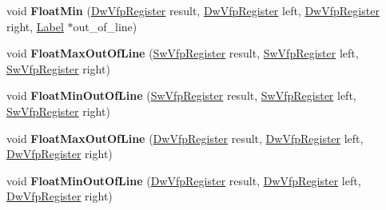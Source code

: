 \begin{DoxyCompactItemize}
\item 
\mbox{\label{classv8_1_1internal_1_1TurboAssembler_ad56ca4667be262f3c181763b7418ae6a}} 
void {\bfseries Float\+Min} (\mbox{\hyperlink{classv8_1_1internal_1_1DwVfpRegister}{Dw\+Vfp\+Register}} result, \mbox{\hyperlink{classv8_1_1internal_1_1DwVfpRegister}{Dw\+Vfp\+Register}} left, \mbox{\hyperlink{classv8_1_1internal_1_1DwVfpRegister}{Dw\+Vfp\+Register}} right, \mbox{\hyperlink{classv8_1_1internal_1_1Label}{Label}} $\ast$out\+\_\+of\+\_\+line)
\item 
\mbox{\label{classv8_1_1internal_1_1TurboAssembler_aeb975af81663503679483df1f5dd9027}} 
void {\bfseries Float\+Max\+Out\+Of\+Line} (\mbox{\hyperlink{classv8_1_1internal_1_1SwVfpRegister}{Sw\+Vfp\+Register}} result, \mbox{\hyperlink{classv8_1_1internal_1_1SwVfpRegister}{Sw\+Vfp\+Register}} left, \mbox{\hyperlink{classv8_1_1internal_1_1SwVfpRegister}{Sw\+Vfp\+Register}} right)
\item 
\mbox{\label{classv8_1_1internal_1_1TurboAssembler_ad75e6097be8ddc545fba95068e153ba6}} 
void {\bfseries Float\+Min\+Out\+Of\+Line} (\mbox{\hyperlink{classv8_1_1internal_1_1SwVfpRegister}{Sw\+Vfp\+Register}} result, \mbox{\hyperlink{classv8_1_1internal_1_1SwVfpRegister}{Sw\+Vfp\+Register}} left, \mbox{\hyperlink{classv8_1_1internal_1_1SwVfpRegister}{Sw\+Vfp\+Register}} right)
\item 
\mbox{\label{classv8_1_1internal_1_1TurboAssembler_ac9c5699f7b6ac4725be988fc17a4b1d4}} 
void {\bfseries Float\+Max\+Out\+Of\+Line} (\mbox{\hyperlink{classv8_1_1internal_1_1DwVfpRegister}{Dw\+Vfp\+Register}} result, \mbox{\hyperlink{classv8_1_1internal_1_1DwVfpRegister}{Dw\+Vfp\+Register}} left, \mbox{\hyperlink{classv8_1_1internal_1_1DwVfpRegister}{Dw\+Vfp\+Register}} right)
\item 
\mbox{\label{classv8_1_1internal_1_1TurboAssembler_a8345cdf4df29e04937b4213609c777de}} 
void {\bfseries Float\+Min\+Out\+Of\+Line} (\mbox{\hyperlink{classv8_1_1internal_1_1DwVfpRegister}{Dw\+Vfp\+Register}} result, \mbox{\hyperlink{classv8_1_1internal_1_1DwVfpRegister}{Dw\+Vfp\+Register}} left, \mbox{\hyperlink{classv8_1_1internal_1_1DwVfpRegister}{Dw\+Vfp\+Register}} right)

\end{DoxyCompactItemize}
